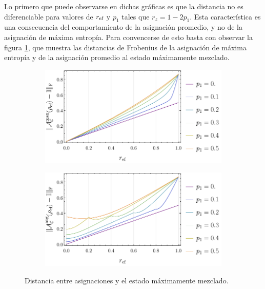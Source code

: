 Lo primero que puede observarse en dichas gráficas es que la distancia no es diferenciable para valores de $r_{\text{ef}}$ y $p_{1}$ tales que $r_{z}=1-2p_{1}$. Esta característica es una consecuencia del comportamiento de la asignación promedio, y no de la asignación de máxima entropía. Para convencerse de esto basta con observar la figura \ref{ap:DistAvgMaxEntId}, que muestra las distancias de Frobenius de la asignación de máxima entropía y de la asignación promedio al estado máximamente mezclado.
\begin{figure}[ht!]
    \centering
    \begin{subfigure}{0.5\textwidth}
      \centering
      \includegraphics[width=1.\linewidth]{chapter5/figures/dist_maxent_or_vs_p.pdf}
    \end{subfigure}%
    \begin{subfigure}{0.5\textwidth}
      \centering
      \includegraphics[width=1.\linewidth]{chapter5/figures/dist_avg_or_vs_p.pdf}
    \end{subfigure}
    \caption{Distancia entre asignaciones y el estado máximamente mezclado.}\label{ap:DistAvgMaxEntId}
\end{figure}

